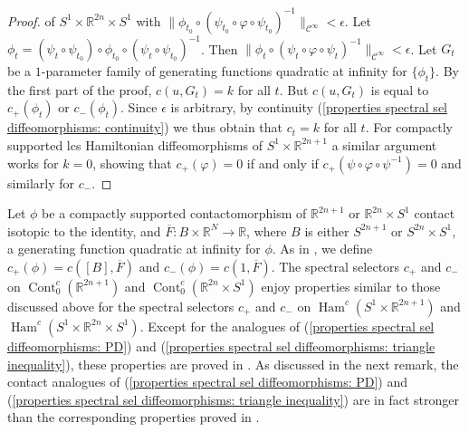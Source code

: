 \documentclass{amsart}
\DeclareMathOperator{\Ham}{Ham}
\DeclareMathOperator{\Cont}{Cont}
\theoremstyle{remark}
\begin{document}
\begin{proof}
of $S^1 \times \mathbb{R}^{2n} \times S^1$ with
$\lVert \phi_{t_0} \circ (\psi_{t_0} \circ \varphi \circ \psi_{t_0})^{-1} \rVert_{\mathcal{C}^{\infty}}
< \epsilon$.
Let $\phi_t = (\psi_t \circ \psi_{t_0}) \circ \phi_{t_0} \circ (\psi_t \circ \psi_{t_0})^{-1}$.
Then
$\lVert \phi_t \circ (\psi_t \circ \varphi \circ \psi_t)^{-1} \rVert_{\mathcal{C}^{\infty}}
< \epsilon$.
Let $G_t$ be a $1$-parameter family of generating functions quadratic at infinity
for $\{\phi_t\}$.
By the first part of the proof,
$c (u, G_t) = k$ for all $t$.
But $c (u, G_t)$ is equal to $c_+(\phi_t)$ or $c_- (\phi_t)$.
Since $\epsilon$ is arbitrary,
by continuity (\ref{properties spectral sel diffeomorphisms: continuity})
we thus obtain that $c_t = k$ for all $t$.
For compactly supported lcs Hamiltonian diffeomorphisms
of $S^1 \times \mathbb{R}^{2n+1}$
a similar argument works for $k = 0$,
showing that $c_+ (\varphi) = 0$
if and only if $c_+ (\psi \circ \varphi \circ \psi^{-1}) = 0$
and similarly for $c_-$.
\end{proof}

Let $\phi$ be a compactly supported
contactomorphism of $\mathbb{R}^{2n+1}$ or $\mathbb{R}^{2n} \times S^1$
contact isotopic to the identity,
and $\overline{F}: B \times \mathbb{R}^N \rightarrow \mathbb{R}$,
where $B$ is either $S^{2n+1}$ or $S^{2n} \times S^1$,
a generating function quadratic at infinity for $\phi$.
As in \cite{Bhupal, San10, San11},
we define $c_+ (\phi) = c ( [B], \overline{F} )$
and $c_- (\phi) = c ( 1, \overline{F} )$.
The spectral selectors $c_+$ and $c_-$
on $\Cont_0^c (\mathbb{R}^{2n+1})$
and $\Cont_0^c (\mathbb{R}^{2n} \times S^1)$
enjoy properties similar to those discussed above
for the spectral selectors $c_+$ and $c_-$
on $\Ham^c (S^1 \times \mathbb{R}^{2n+1})$
and $\Ham^c (S^1 \times \mathbb{R}^{2n} \times S^1)$.
Except for the analogues of (\ref{properties spectral sel diffeomorphisms: PD})
and (\ref{properties spectral sel diffeomorphisms: triangle inequality}),
these properties are proved in \cite{Bhupal, San10, San11}.
As discussed in the next remark,
the contact analogues of (\ref{properties spectral sel diffeomorphisms: PD})
and (\ref{properties spectral sel diffeomorphisms: triangle inequality})
are in fact stronger than the corresponding properties
proved in \cite{Bhupal, San10, San11}.
\end{document}
